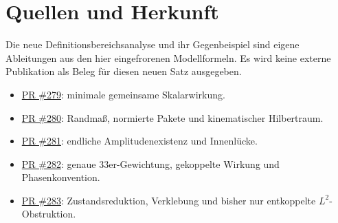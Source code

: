 \documentclass[10pt,a4paper]{article}
\begin{document}
\section*{Quellen und Herkunft}
Die neue Definitionsbereichsanalyse und ihr Gegenbeispiel sind eigene
Ableitungen aus den hier eingefrorenen Modellformeln. Es wird keine externe
Publikation als Beleg für diesen neuen Satz ausgegeben.
\begin{itemize}
\item \href{https://github.com/thomasmgfeller/x6-spectral-astrolabium/pull/279}{PR \#279}: minimale gemeinsame Skalarwirkung.
\item \href{https://github.com/thomasmgfeller/x6-spectral-astrolabium/pull/280}{PR \#280}: Randmaß, normierte Pakete und kinematischer Hilbertraum.
\item \href{https://github.com/thomasmgfeller/x6-spectral-astrolabium/pull/281}{PR \#281}: endliche Amplitudenexistenz und Innenlücke.
\item \href{https://github.com/thomasmgfeller/x6-spectral-astrolabium/pull/282}{PR \#282}: genaue 33er-Gewichtung, gekoppelte Wirkung und Phasenkonvention.
\item \href{https://github.com/thomasmgfeller/x6-spectral-astrolabium/pull/283}{PR \#283}: Zustandsreduktion, Verklebung und bisher nur entkoppelte $L^2$-Obstruktion.
\end{itemize}
\end{document}
